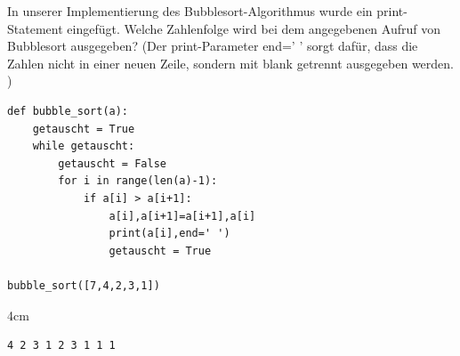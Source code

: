 \question[3]
In unserer Implementierung des Bubblesort-Algorithmus wurde ein print-Statement eingefügt.
Welche Zahlenfolge wird bei dem angegebenen Aufruf von Bubblesort ausgegeben?
(Der print-Parameter end=' ' sorgt dafür, dass die Zahlen nicht in einer neuen Zeile, 
sondern mit blank getrennt ausgegeben werden. )

\begin{lstlisting}
def bubble_sort(a):
    getauscht = True
    while getauscht:
        getauscht = False
        for i in range(len(a)-1):
            if a[i] > a[i+1]:
                a[i],a[i+1]=a[i+1],a[i]
                print(a[i],end=' ')   
                getauscht = True
                
bubble_sort([7,4,2,3,1])
\end{lstlisting}
\begin{solutionbox}{4cm}
\begin{lstlisting}
4 2 3 1 2 3 1 1 1
\end{lstlisting}
\end{solutionbox}
